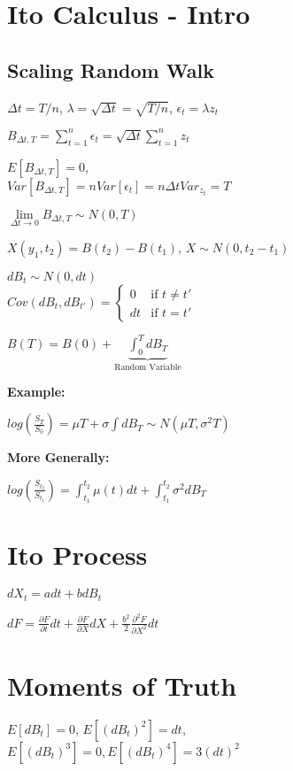 \section{Ito Calculus - Intro}
\subsection{Scaling Random Walk}

$\Delta t = T/n$, $\lambda = \sqrt{\Delta t} = \sqrt{T/n}$, $\epsilon_t = \lambda z_t$

$B_{\Delta t, T} = \sum_{t=1}^n \epsilon_t = \sqrt{\Delta t} \sum_{t=1}^n z_t$

$E[B_{\Delta t, T}] = 0$, \\$Var[B_{\Delta t, T}] = n Var[\epsilon_t] = n\Delta t Var_{z_t} = T$

$\lim\limits_{\Delta t \to 0}B_{\Delta t, T} \sim N(0, T)$

$X(y_1, t_2) = B(t_2) - B(t_1)$, $X \sim N(0, t_2 - t_1)$

$dB_t \sim N(0, dt)$\\
$Cov(dB_t, dB_{t'}) =
    \begin{cases}
        0 & \text{if } t \neq t' \\
        dt & \text{if } t = t'
\end{cases}$

$B(T) = B(0) + \underbrace{\int_0^T dB_T}_\text{Random Variable}$

\textbf{Example:}

$log(\frac{S_T}{S_0})=  \mu T + \sigma \int dB_T \sim N(\mu T, \sigma^2 T)$

\textbf{More Generally:}

$log(\frac{S_{t_2}}{S_{t_1}})=  \int_{t_1}^{t_2}\mu(t) dt + \int_{t_1}^{t_2}\sigma^2 dB_T $


\section{Ito Process}

$dX_t = a dt + b dB_t$

$dF = \frac{\partial F}{\partial t} dt + \frac{\partial F}{\partial X}dX + \frac{b^2}{2} \frac{\partial^2 F}{\partial X^2}dt$

\section{Moments of Truth}

$E[dB_t] = 0$, $E[(dB_t)^2] = dt$, \\$E[(dB_t)^3]=0, E[(dB_t)^4] = 3 (dt)^2$

